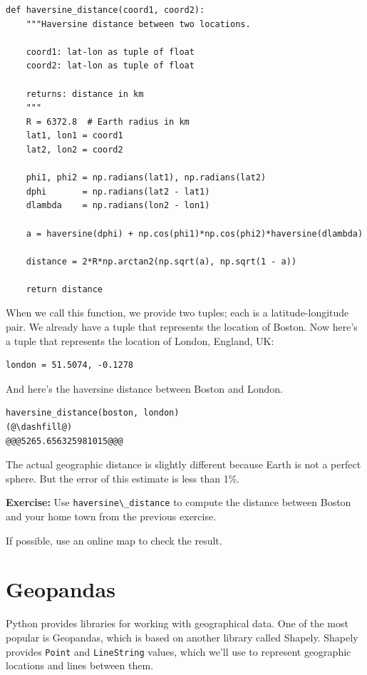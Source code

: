 \begin{lstlisting}[]
def haversine_distance(coord1, coord2):
    """Haversine distance between two locations.
    
    coord1: lat-lon as tuple of float 
    coord2: lat-lon as tuple of float
    
    returns: distance in km
    """
    R = 6372.8  # Earth radius in km
    lat1, lon1 = coord1
    lat2, lon2 = coord2
    
    phi1, phi2 = np.radians(lat1), np.radians(lat2) 
    dphi       = np.radians(lat2 - lat1)
    dlambda    = np.radians(lon2 - lon1)
    
    a = haversine(dphi) + np.cos(phi1)*np.cos(phi2)*haversine(dlambda)
    
    distance = 2*R*np.arctan2(np.sqrt(a), np.sqrt(1 - a))
    
    return distance
\end{lstlisting}

When we call this function, we provide two tuples; each is a
latitude-longitude pair. We already have a tuple that represents the
location of Boston. Now here's a tuple that represents the location of
London, England, UK:

\begin{lstlisting}[]
london = 51.5074, -0.1278
\end{lstlisting}

And here's the haversine distance between Boston and London.

\begin{lstlisting}[]
haversine_distance(boston, london)
(@\dashfill@)
@@@5265.656325981015@@@
\end{lstlisting}

The actual geographic distance is slightly different because Earth is
not a perfect sphere. But the error of this estimate is less than 1\%.

\textbf{Exercise:} Use \passthrough{\lstinline!haversine\_distance!} to
compute the distance between Boston and your home town from the previous
exercise.

If possible, use an online map to check the result.

\hypertarget{geopandas}{%
\section{Geopandas}\label{geopandas}}

Python provides libraries for working with geographical data. One of the
most popular is Geopandas, which is based on another library called
Shapely. Shapely provides \passthrough{\lstinline!Point!} and
\passthrough{\lstinline!LineString!} values, which we'll use to
represent geographic locations and lines between them.

